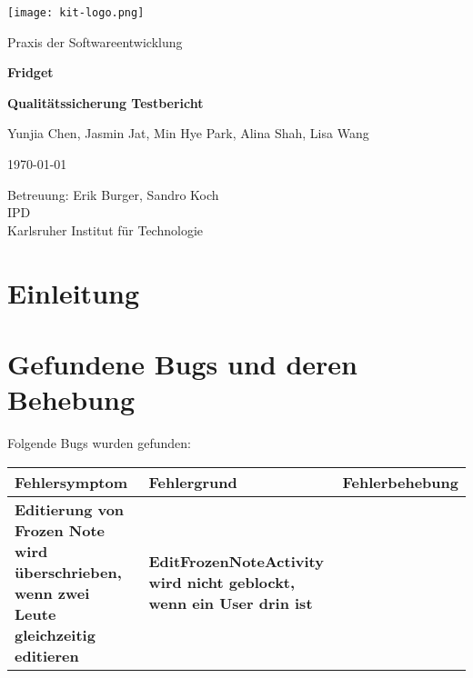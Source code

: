 \documentclass[a4paper]{scrreprt}
\begin{document}
	
	\begin{flushright}
		\texttt{[image: kit-logo.png]}\\[0.5cm]
	\end{flushright}
	\vspace*{2cm}
	
	\begin{center}
		\large Praxis der Softwareentwicklung
		\vspace*{1.5cm}
		
		\textbf{\huge Fridget}
		\vspace*{1cm}
		
		\textbf{\Large Qualitätssicherung Testbericht}
		\vspace*{2cm}
		
		Yunjia Chen, Jasmin Jat, Min Hye Park, Alina Shah, Lisa Wang
		\vspace*{1cm}
		
		\today
		\vspace*{2.5cm}
		
		Betreuung: Erik Burger, Sandro Koch\\[0.5cm]
		IPD\\[0.5cm]
		
		Karlsruher Institut für Technologie
		
	\end{center}

	\thispagestyle{empty}
	
	\tableofcontents
	
	\chapter{Einleitung}
	
	
	\chapter{Gefundene Bugs und deren Behebung}
	Folgende Bugs wurden gefunden:
	\begin{flushleft}
		\begin{longtable}{|p{}|p{}|p{}|}
		\hline
		\textbf{Fehlersymptom} & \textbf{Fehlergrund} & \textbf{Fehlerbehebung} \\
		\hline	
		\textbf{Editierung von Frozen Note wird überschrieben, wenn zwei Leute gleichzeitig editieren
		} & \textbf{EditFrozenNoteActivity wird nicht geblockt, wenn ein User drin ist} & \textbf{} \\
		\hline
		\end{longtable}
	\end{flushleft}	
	
\end{document}
